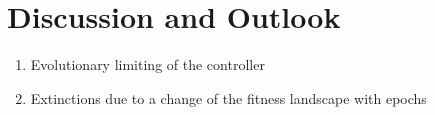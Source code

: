 \documentclass[main]{subfiles}
\begin{document}
\setcounter{chapter}{4}

\chapter{Discussion and Outlook} %

\label{Chapter\thechapter} %


\begin{enumerate}
\item Evolutionary limiting of the controller
\item Extinctions due to a change of the fitness landscape with epochs
\end{enumerate}




\end{document}
